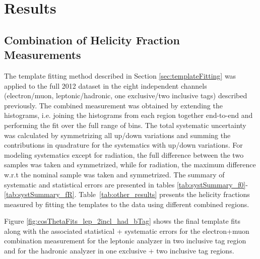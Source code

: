 \section{Results}
\label{sec:result}
\subsection{Combination of Helicity Fraction Measurements}
The template fitting method described in Section \ref{sec:templateFitting} was applied to the full 2012 dataset in the eight independent channels (electron/muon, leptonic/hadronic, one exclusive/two inclusive \bt tags) described previously. The combined measurement was obtained by extending the histograms, i.e. joining the histograms from each region together end-to-end and performing the fit over the full range of bins. The total systematic uncertainty was calculated by symmetrizing all up/down variations and summing the contributions in quadrature for the systematics with up/down variations. For modeling systematics except for radiation, the full difference between the two samples was taken and symmetrized, while for radiation, the maximum difference w.r.t the nominal sample was taken and symmetrized. The summary of systematic and statistical errors are presented in tables \ref{tab:systSummary_f0}-\ref{tab:systSummary_fR}. Table~\ref{tab:other_results} presents the \w helicity fractions measured by fitting the templates to the data using different combined regions. 


Figure \ref{fig:cosThetaFits_lep_2incl_had_bTag} shows the final template fits along with the associated statistical + systematic errors for the electron+muon combination measurement for the leptonic analyzer in two inclusive \bt tag region and for the hadronic analyzer in one exclusive + two inclusive \bt tag regions.%

